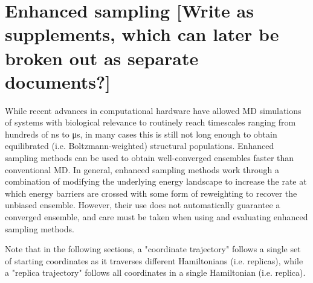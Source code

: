 \section{Enhanced sampling [Write as supplements, which can later be broken out as separate documents?]}

While recent advances in computational hardware have allowed MD simulations of systems with biological relevance to routinely reach timescales ranging from hundreds of \si{\nano\second} to \si{\micro\second}, in many cases this is still not long enough to obtain equilibrated (i.e. Boltzmann-weighted) structural populations. Enhanced sampling methods can be used to obtain well-converged ensembles faster than conventional MD. In general, enhanced sampling methods work through a combination of modifying the underlying energy landscape to increase the rate at which energy barriers are crossed with some form of reweighting to recover the unbiased ensemble. However, their use does not automatically guarantee a converged ensemble, and care must be taken when using and evaluating enhanced sampling methods.

Note that in the following sections, a "coordinate trajectory" follows a single set of starting coordinates as it traverses different Hamiltonians (i.e. replicas), while a "replica trajectory" follows all coordinates in a single Hamiltonian (i.e. replica).

